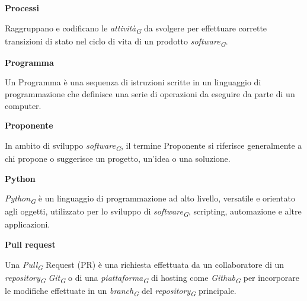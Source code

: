 \documentclass{article}
\begin{document}
\vspace{0.4cm}

\textbf{Processi}

\vspace{0.1cm}

Raggruppano e codificano le \textit{attività}\textsubscript{\textit{G}} da svolgere per effettuare corrette transizioni di stato nel ciclo di vita di un prodotto \textit{software}\textsubscript{\textit{G}}.

\vspace{0.4cm}

\textbf{Programma}

\vspace{0.1cm}

Un Programma è una sequenza di istruzioni scritte in un linguaggio di programmazione che definisce una serie di operazioni da eseguire da parte di un computer.

\vspace{0.4cm}

\textbf{Proponente}

\vspace{0.1cm}

In ambito di sviluppo \textit{software}\textsubscript{\textit{G}}, il termine Proponente si riferisce generalmente a chi propone o suggerisce un progetto, un'idea o una soluzione.

\vspace{0.4cm}

\textbf{Python}

\vspace{0.1cm}

\textit{Python}\textsubscript{\textit{G}} è un linguaggio di programmazione ad alto livello, versatile e orientato agli oggetti, utilizzato per lo sviluppo di \textit{software}\textsubscript{\textit{G}}, scripting, automazione e altre applicazioni.

\vspace{0.4cm}

\textbf{Pull request}

\vspace{0.1cm}

Una \textit{Pull}\textsubscript{\textit{G}} Request (PR) è una richiesta effettuata da un collaboratore di un \textit{repository}\textsubscript{\textit{G}} \textit{Git}\textsubscript{\textit{G}} o di una \textit{piattaforma}\textsubscript{\textit{G}} di hosting come \textit{Github}\textsubscript{\textit{G}} per incorporare le modifiche effettuate in un \textit{branch}\textsubscript{\textit{G}} del \textit{repository}\textsubscript{\textit{G}} principale.
\end{document}
